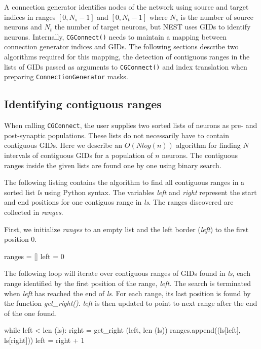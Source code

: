 \documentclass{frontiersSCNS} %
\begin{document}
A connection generator identifies nodes of the network using source
and target indices in ranges $[0, N_s-1]$ and $[0, N_t-1]$ where $N_s$
is the number of source neurons and $N_t$ the number of target
neurons, but NEST uses GIDs to identify neurons.  Internally,
\verb|CGConnect()| needs to maintain a mapping between connection
generator indices and GIDs. The following sections describe two
algorithms required for this mapping, the detection of contiguous
ranges in the lists of GIDs passed as arguments to \verb|CGConnect()|
and index translation when preparing \verb|ConnectionGenerator| masks.

\subsection*{Identifying contiguous ranges}

When calling \verb|CGConnect|, the user supplies two sorted lists of
neurons as pre- and post-synaptic populations. These lists do not
necessarily have to contain contiguous GIDs.  Here we describe an
$O(Nlog(n))$ algorithm for finding $N$ intervals of contiguous GIDs
for a population of $n$ neurons.  The contiguous ranges inside the
given lists are found one by one using binary search.

The following listing contains the algorithm to find all contiguous
ranges in a sorted list \emph{ls} using Python syntax. The variables
\emph{left} and \emph{right} represent the start and end positions for
one contiguos range in \emph{ls}.  The ranges discovered are collected
in \emph{ranges}.

First, we initialize \emph{ranges} to an empty list and the left
border (\emph{left}) to the first position 0.

\begin{pythoncode}
ranges = []
left = 0
\end{pythoncode}

The following loop will iterate over contiguous ranges of GIDs found
in \emph{ls}, each range identified by the first position of the
range, \emph{left}. The search is terminated when \emph{left} has
reached the end of \emph{ls}.  For each range, its last position is
found by the function \emph{get\_right()}. \emph{left} is then updated
to point to next range after the end of the one found.

\begin{pythoncode}
while left < len (ls):
    right = get_right (left, len (ls))
    ranges.append((ls[left], ls[right]))
    left = right + 1
\end{pythoncode}
\end{document}
